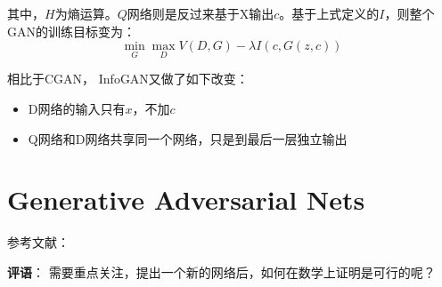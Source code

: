 其中，$H$为熵运算。$Q$网络则是反过来基于X输出$c$。基于上式定义的$I$，则整个GAN的训练目标变为：
\begin{displaymath}
\min_G \max_D V(D, G) - \lambda I(c, G(z, c))
\end{displaymath}

相比于CGAN， InfoGAN又做了如下改变：
\begin{itemize}
\item D网络的输入只有$x$，不加$c$
\item Q网络和D网络共享同一个网络，只是到最后一层独立输出
\end{itemize}

\section{Generative Adversarial Nets}

参考文献：\cite{Goodfellow2014GAN}

{\color{red} \textbf{评语}： 需要重点关注，提出一个新的网络后，如何在数学上证明是可行的呢？}





















